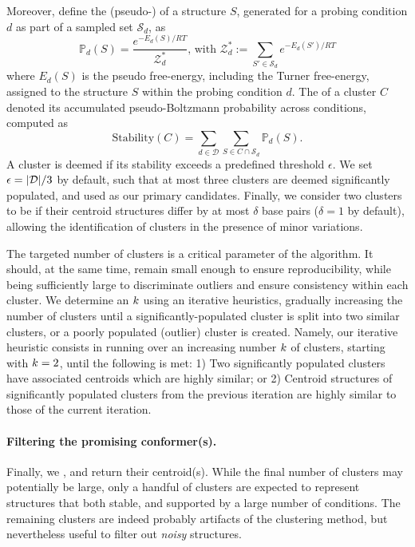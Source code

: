 \documentclass[a4,center,fleqn]{NAR}
\begin{document}
{Moreover, define the (pseudo-) of a structure $S$, generated for a probing condition $d$ as part of a sampled  set $\mathcal{S}_d$, as
$$\mathbb{P}_d(S) = \frac{e^{-E_d(S)/RT}}{\mathcal{Z}^*_d} \text{, with } \mathcal{Z}^*_d := \sum_{S'\in \mathcal{S}_d} e^{-E_d(S')/RT}$$
where $E_d(S)$ is the pseudo free-energy, including the Turner free-energy, assigned to the structure $S$ within the probing condition $d$.
The  of a cluster $C$ denoted its accumulated pseudo-Boltzmann probability across conditions, computed as
$$\text{Stability}(C) = \sum_{d\in \mathcal{D}} \sum_{S\in C\cap \mathcal{S}_d}  \mathbb{P}_d(S).$$
A cluster is deemed  if its stability exceeds a predefined threshold $\epsilon$. 
We set  $\epsilon ={|\mathcal{D}|}/3$ by default, such that at most three clusters are deemed significantly populated, and used as our primary candidates.
Finally, we consider two clusters to be  if their centroid structures differ by at most $\delta$ base pairs ($\delta=1$ by default), allowing the identification of clusters in the presence of minor variations.




The targeted number of clusters is a critical parameter of the \CL{} algorithm. It should, at the same time, remain small enough to ensure reproducibility, while being sufficiently large to discriminate outliers and ensure consistency within each cluster. We determine an  $k$ using an iterative heuristics, gradually increasing the number of clusters until a significantly-populated cluster is split into two similar clusters, or a poorly populated (outlier) cluster is created.
Namely, our iterative heuristic consists in running \CL over an increasing number $k$ of clusters, starting with $k=2$, until the following  is met: 1) Two significantly populated clusters have associated centroids which are highly similar; or 2) Centroid structures of significantly populated clusters from the previous iteration are highly similar to those of the current iteration.}


\paragraph{Filtering the promising conformer(s).} Finally, we , and return their centroid(s). While the final number of clusters may potentially be large, only a handful of clusters are expected to represent structures that  both stable, and supported by a large number of conditions. The remaining clusters are indeed probably artifacts of the clustering method, but nevertheless useful to filter out \emph{noisy} structures. 
\end{document}
